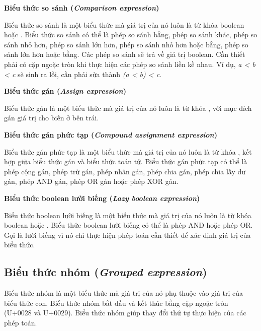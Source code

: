 \noindent\textbf{Biểu thức so sánh (\textit{Comparison expression})}

\regexcompexpr

Biểu thức so sánh là một biểu thức mà giá trị của nó luôn là từ khóa boolean  hoặc . Biểu thức so sánh có thể là phép so sánh bằng, phép so sánh khác, phép so sánh nhỏ hơn, phép so sánh lớn hơn, phép so sánh nhỏ hơn hoặc bằng, phép so sánh lớn hơn hoặc bằng. Các phép so sánh sẽ trả về giá trị boolean. Cần thiết phải có cặp ngoặc tròn khi thực hiện các phép so sánh liền kề nhau. Ví dụ, \textit{a < b < c} sẽ sinh ra lỗi, cần phải sửa thành \textit{(a < b) < c}.

\noindent\textbf{Biểu thức gán (\textit{Assign expression})}

\regexassignexpr

Biểu thức gán là một biểu thức mà giá trị của nó luôn là từ khóa , với mục đích gán giá trị cho biến ở bên trái.

\noindent\textbf{Biểu thức gán phức tạp (\textit{Compound assignment expression})}

\regexcompoundassignexpr

Biểu thức gán phức tạp là một biểu thức mà giá trị của nó luôn là từ khóa , kết hợp giữa biểu thức gán và biểu thức toán tử. Biểu thức gán phức tạp có thể là phép cộng gán, phép trừ gán, phép nhân gán, phép chia gán, phép chia lấy dư gán, phép AND gán, phép OR gán hoặc phép XOR gán.

\noindent\textbf{Biểu thức boolean lười biếng (\textit{Lazy boolean expression})}

\regexlazyboolexpr

Biểu thức boolean lười biếng là một biểu thức mà giá trị của nó luôn là từ khóa boolean  hoặc . Biểu thức boolean lười biếng có thể là phép AND hoặc phép OR. Gọi là lười biếng vì nó chỉ thực hiện phép toán cần thiết để xác định giá trị của biểu thức.

\subsection{Biểu thức nhóm (\textit{Grouped expression})}

\regexgroupexpr

Biểu thức nhóm là một biểu thức mà giá trị của nó phụ thuộc vào giá trị của biểu thức con. Biểu thức nhóm bắt đầu và kết thúc bằng cặp ngoặc tròn (U+0028 và U+0029). Biểu thức nhóm giúp thay đổi thứ tự thực hiện của các phép toán.

